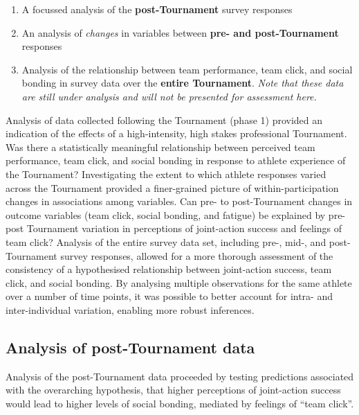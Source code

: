 \begin{enumerate}
  \item A focussed analysis of the \textbf{post-Tournament} survey responses
  \item An analysis of \textit{changes} in variables between \textbf{pre- and post-Tournament} responses
  \item Analysis of the relationship between team performance, team click, and social bonding in survey data over the \textbf{entire Tournament}. \textit{Note that these data are still under analysis and will not be presented for assessment here.}
\end{enumerate}

Analysis of data collected following the Tournament (phase 1) provided an indication of the effects of a high-intensity, high stakes professional Tournament. Was there a statistically meaningful relationship between perceived team performance, team click, and social bonding in response to athlete experience of the Tournament?  Investigating the extent to which athlete responses varied across the Tournament provided a finer-grained picture of within-participation changes in associations among variables.  Can pre- to post-Tournament changes in outcome variables (team click, social bonding, and fatigue) be explained by pre-post Tournament variation in perceptions of joint-action success and feelings of team click?  Analysis of the entire survey data set, including pre-, mid-, and post-Tournament survey responses, allowed for a more thorough assessment of the consistency of a hypothesised relationship between joint-action success, team click, and social bonding. By analysing multiple observations for the same athlete over a number of time points, it was possible to better account for intra- and inter-individual variation, enabling more robust inferences.











\subsection{Analysis of post-Tournament data}
Analysis of the post-Tournament data proceeded by testing predictions associated with the overarching hypothesis, that higher perceptions of joint-action success would lead to higher levels of social bonding, mediated by feelings of ``team click''.

